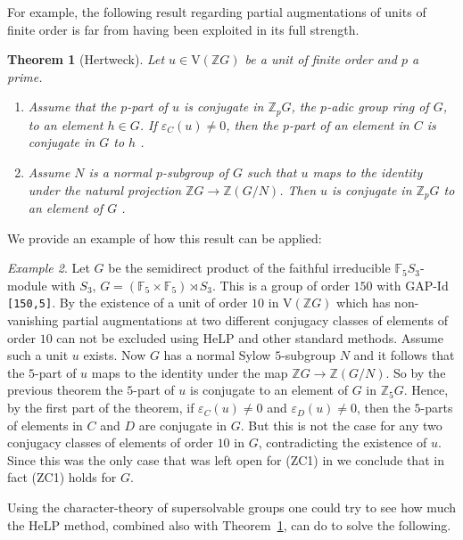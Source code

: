 \documentclass[10pt,a4paper,reqno]{amsart}
\newtheorem{theorem}{Theorem}[section]
\theoremstyle{definition}
\theoremstyle{remark}
\newtheorem{example}[theorem]{Example}
\newcommand{\V}{\mathrm{V}}
\newcommand{\ZZ}{\mathbb{Z}}
\begin{document}
For example, the following result regarding partial augmentations of units of finite order is far from having been exploited in its full strength.

\begin{theorem}[Hertweck]\label{th:padic}  Let $u \in \V(\ZZ G)$ be a unit of finite order and $p$ a prime.
\begin{enumerate}
\item Assume that the $p$-part of $u$ is conjugate in $\ZZ_p G$, the $p$-adic group ring of $G$, to an element $h \in G$. If $\varepsilon_C(u) \neq 0$, then the $p$-part of an element in $C$ is conjugate in $G$ to $h$ \cite[Lemma 2.2]{Her08}.
\item Assume $N$ is a normal $p$-subgroup of $G$ such that $u$ maps to the identity under the natural projection $\ZZ G \rightarrow \ZZ (G/N)$. Then $u$ is conjugate in $\ZZ_p G$ to an element of $G$ \cite{MargolisHertweck}.
\end{enumerate}
\end{theorem} 

We provide an example of how this result can be applied:

\begin{example}
 Let $G$ be the semidirect product of the faithful irreducible $\mathbb{F}_5S_3$-module with $S_3$, $ G = (\mathbb{F}_5 \times \mathbb{F}_5) \rtimes S_3$. This is a group of order $150$ with \textsf{GAP}-Id \texttt{[150,5]}. By \cite{BHKMS18} the existence of a unit of order $10$ in $\V(\ZZ G)$ which has non-vanishing partial augmentations at two different conjugacy classes of elements of order $10$ can not be excluded using HeLP and other standard methods. Assume such a unit $u$ exists. Now $G$ has a normal Sylow $5$-subgroup $N$ and it follows that the $5$-part of $u$ maps to the identity under the map $\ZZ G \rightarrow \ZZ (G/N)$. So by the previous theorem the $5$-part of $u$ is conjugate to an element of $G$ in $\ZZ_5 G$. Hence, by the first part of the theorem, if $\varepsilon_C(u) \neq 0$ and $\varepsilon_D(u) \neq 0$, then the $5$-parts of elements in $C$ and $D$ are conjugate in $G$. But this is not the case for any two conjugacy classes of elements of order $10$ in $G$, contradicting the existence of $u$. Since this was the only case that was left open for (ZC1) in \cite{BHKMS18} we conclude that in fact (ZC1) holds for $G$.
\end{example}

Using the character-theory of supersolvable groups one could try to see how much the HeLP method, combined also with Theorem~\ref{th:padic}, can do to solve the following.
\end{document}
